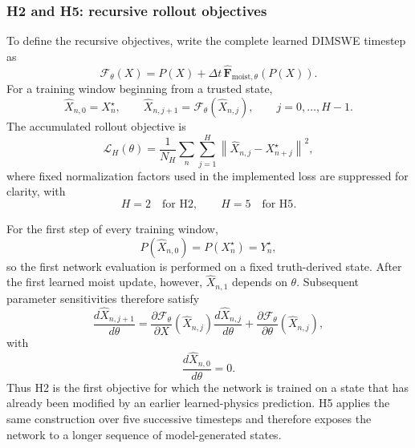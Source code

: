 \documentclass[12pt]{article}
\begin{document}
\subsubsection{H2 and H5: recursive rollout objectives}

To define the recursive objectives, write the complete learned DIMSWE timestep
as
\begin{equation}
	\mathcal{F}_\theta(X)
	=
	P(X)
	+
	\Delta t\,
	\widehat{\mathbf F}_{\mathrm{moist},\theta}
	\!\left(P(X)\right).
	\label{eq:learned_full_step}
\end{equation}
For a training window beginning from a trusted state,
\begin{equation}
	\widehat X_{n,0}=X_n^\star,
	\qquad
	\widehat X_{n,j+1}
	=
	\mathcal{F}_\theta(\widehat X_{n,j}),
	\qquad
	j=0,\ldots,H-1.
	\label{eq:recursive_rollout}
\end{equation}
The accumulated rollout objective is
\begin{equation}
	\mathcal{L}_{H}(\theta)
	=
	\frac{1}{N_H}
	\sum_n
	\sum_{j=1}^{H}
	\left\|
	\widehat X_{n,j}
	-
	X_{n+j}^\star
	\right\|^2,
	\label{eq:recursive_horizon_loss}
\end{equation}
where fixed normalization factors used in the implemented loss are suppressed
for clarity, with
\begin{equation}
	H=2 \quad\text{for H2},
	\qquad
	H=5 \quad\text{for H5}.
\end{equation}

For the first step of every training window,
\begin{equation}
	P(\widehat X_{n,0})
	=
	P(X_n^\star)
	=
	Y_n^\star,
\end{equation}
so the first network evaluation is performed on a fixed truth-derived state.
After the first learned moist update, however, $\widehat X_{n,1}$ depends on
$\theta$. Subsequent parameter sensitivities therefore satisfy
\begin{equation}
	\frac{d\widehat X_{n,j+1}}{d\theta}
	=
	\frac{\partial \mathcal{F}_\theta}{\partial X}
	(\widehat X_{n,j})
	\frac{d\widehat X_{n,j}}{d\theta}
	+
	\frac{\partial \mathcal{F}_\theta}{\partial\theta}
	(\widehat X_{n,j}),
	\label{eq:recursive_parameter_sensitivity}
\end{equation}
with
\begin{equation}
	\frac{d\widehat X_{n,0}}{d\theta}=0.
\end{equation}
Thus H2 is the first objective for which the network is trained on a state
that has already been modified by an earlier learned-physics prediction.
H5 applies the same construction over five successive timesteps and therefore
exposes the network to a longer sequence of model-generated states.
\end{document}
